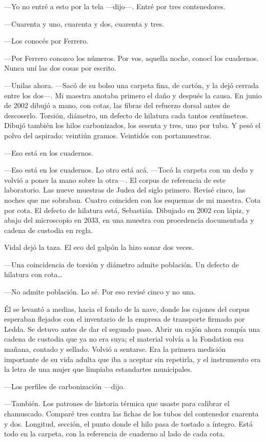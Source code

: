 ---Yo no entré a esto por la tela ---dijo---. Entré por tres contenedores.

---Cuarenta y uno, cuarenta y dos, cuarenta y tres.

---Los conocés por Ferrero.

---Por Ferrero conozco los números. Por vos, aquella noche, conocí los cuadernos. Nunca uní las dos cosas por escrito.

---Unilas ahora. ---Sacó de su bolso una carpeta fina, de cartón, y la dejó cerrada entre los dos---. Mi maestra anotaba primero el daño y después la causa. En junio de 2002 dibujó a mano, con cotas, las fibras del refuerzo dorsal antes de descoserlo. Torsión, diámetro, un defecto de hilatura cada tantos centímetros. Dibujó también los hilos carbonizados, los sesenta y tres, uno por tubo. Y pesó el polvo del aspirado: veintiún gramos. Veintidós con portamuestras.

---Eso está en los cuadernos.

---Eso está en los cuadernos. Lo otro está acá. ---Tocó la carpeta con un dedo y volvió a poner la mano sobre la otra---. El corpus de referencia de este laboratorio. Las nueve muestras de Judea del siglo primero. Revisé cinco, las noches que me sobraban. Cuatro coinciden con los esquemas de mi maestra. Cota por cota. El defecto de hilatura está, Sebastián. Dibujado en 2002 con lápiz, y abajo del microscopio en 2033, en una muestra con procedencia documentada y cadena de custodia en regla.

Vidal dejó la taza. El eco del galpón la hizo sonar dos veces.

---Una coincidencia de torsión y diámetro admite población. Un defecto de hilatura con cota\ldots{}

---No admite población. Lo sé. Por eso revisé cinco y no una.

Él se levantó a medias, hacia el fondo de la nave, donde los cajones del corpus esperaban flejados con el inventario de la empresa de transporte firmado por Ledda. Se detuvo antes de dar el segundo paso. Abrir un cajón ahora rompía una cadena de custodia que ya no era suya; el material volvía a la Fondation esa mañana, contado y sellado. Volvió a sentarse. Era la primera medición importante de su vida adulta que iba a aceptar sin repetirla, y el instrumento era la letra de una mujer que limpiaba estandartes municipales.

---Los perfiles de carbonización ---dijo.

---También. Los patrones de historia térmica que usaste para calibrar el chamuscado. Comparé tres contra las fichas de los tubos del contenedor cuarenta y dos. Longitud, sección, el punto donde el hilo pasa de tostado a íntegro. Está todo en la carpeta, con la referencia de cuaderno al lado de cada cota.

